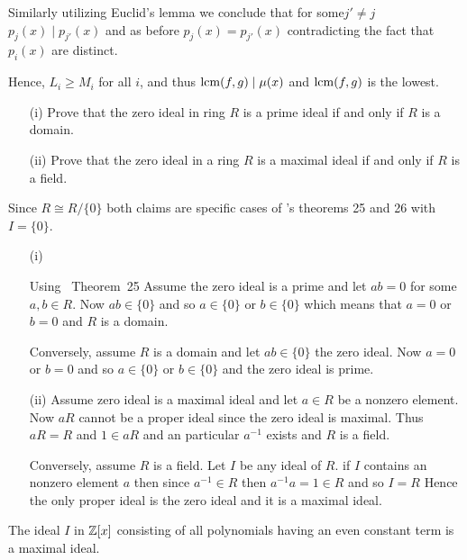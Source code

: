 \begin{myenumerate}
Similarly utilizing Euclid's lemma we conclude
that for some\(j'\neq j\) \(p_j(x)\mid p_{j'}(x)\)
and as before \(p_j(x)=p_{j'}(x)\) contradicting the fact
that \(p_i(x)\) are distinct.

Hence, \(L_i\geq M_i\) for all $i$,
and thus \(\mathop{\rm lcm}\nolimits(f,g)\mid\mu(x)\) and \(\mathop{\rm lcm}\nolimits(f,g)\) is the lowest.

\item
\begin{excopy}
\begin{itemize}
 \item[(i)]
   Prove that the zero ideal in ring $R$ is a prime ideal if and only if
   $R$ is a domain.
 \item[(ii)]
   Prove that the zero ideal in a ring $R$ is a maximal ideal if and only if
   $R$ is a field.
\end{itemize}
\end{excopy}

Since \(R\cong R/\{0\}\) both claims are specific cases
of \cite{Rotman98}'s theorems 25 and 26 with \(I=\{0\}\).

\begin{itemize}
 \item[(i)]

   Using \cite{Rotman98}~Theorem~25
   Assume the zero ideal is a prime and let \(ab=0\) for some \(a,b\in R\).
   Now \(ab\in\{0\}\) and so \(a\in\{0\}\) or \(b\in\{0\}\)
   which means that \(a=0\) or \(b=0\) and $R$ is a domain.

   Conversely, assume $R$ is a domain and let \(ab\in \{0\}\) the zero ideal.
   Now \(a=0\) or \(b=0\) and so \(a\in\{0\}\) or \(b\in\{0\}\)
   and the zero ideal is prime.
 \item[(ii)]
   Assume zero ideal is a maximal ideal and let \(a\in R\) be a nonzero element.
   Now \(aR\) cannot be a proper ideal since the zero ideal is maximal.
   Thus \(aR=R\) and \(1\in aR\) and an particular \(a^{-1}\) exists
   and $R$ is a field.

   Conversely, assume $R$ is a field.
   Let $I$ be any ideal of $R$.
   if $I$ contains an nonzero element $a$ then
   since \(a^{-1}\in R\) then \(a^{-1}a=1\in R\) and so \(I=R\)
   Hence the only proper ideal is the zero ideal and it is a maximal ideal.
\end{itemize}


\item
\begin{excopy}
The ideal $I$ in \(\mathbb{Z}[x]\) consisting of all polynomials having an even
constant term is a maximal ideal.
\end{excopy}


\end{myenumerate}
